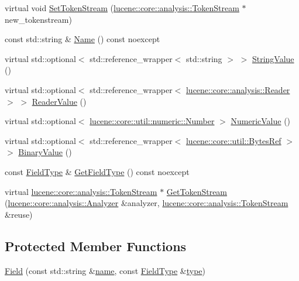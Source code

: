 \begin{DoxyCompactItemize}
\item 
virtual void \mbox{\hyperlink{classlucene_1_1core_1_1document_1_1Field_adfb4f4d5a2b2a8c9334186c93fd20c3b}{Set\+Token\+Stream}} (\mbox{\hyperlink{classlucene_1_1core_1_1analysis_1_1TokenStream}{lucene\+::core\+::analysis\+::\+Token\+Stream}} $\ast$new\+\_\+tokenstream)
\item 
const std\+::string \& \mbox{\hyperlink{classlucene_1_1core_1_1document_1_1Field_a9b6d39e8c30c59bfe0556c38beeeb06e}{Name}} () const noexcept
\item 
virtual std\+::optional$<$ std\+::reference\+\_\+wrapper$<$ std\+::string $>$ $>$ \mbox{\hyperlink{classlucene_1_1core_1_1document_1_1Field_a6b300229888f74a4cd76c40346c04234}{String\+Value}} ()
\item 
virtual std\+::optional$<$ std\+::reference\+\_\+wrapper$<$ \mbox{\hyperlink{classlucene_1_1core_1_1analysis_1_1Reader}{lucene\+::core\+::analysis\+::\+Reader}} $>$ $>$ \mbox{\hyperlink{classlucene_1_1core_1_1document_1_1Field_a06a7e8bad6d98767adee5e0e42941f06}{Reader\+Value}} ()
\item 
virtual std\+::optional$<$ \mbox{\hyperlink{classlucene_1_1core_1_1util_1_1numeric_1_1Number}{lucene\+::core\+::util\+::numeric\+::\+Number}} $>$ \mbox{\hyperlink{classlucene_1_1core_1_1document_1_1Field_a858814043215c98bacf6ecc823d078ea}{Numeric\+Value}} ()
\item 
virtual std\+::optional$<$ std\+::reference\+\_\+wrapper$<$ \mbox{\hyperlink{classlucene_1_1core_1_1util_1_1BytesRef}{lucene\+::core\+::util\+::\+Bytes\+Ref}} $>$ $>$ \mbox{\hyperlink{classlucene_1_1core_1_1document_1_1Field_adf4cc37537f8889dda2469c22481193b}{Binary\+Value}} ()
\item 
const \mbox{\hyperlink{classlucene_1_1core_1_1document_1_1FieldType}{Field\+Type}} \& \mbox{\hyperlink{classlucene_1_1core_1_1document_1_1Field_a06bffb93596bfbe170e795279d30ae4f}{Get\+Field\+Type}} () const noexcept
\item 
virtual \mbox{\hyperlink{classlucene_1_1core_1_1analysis_1_1TokenStream}{lucene\+::core\+::analysis\+::\+Token\+Stream}} $\ast$ \mbox{\hyperlink{classlucene_1_1core_1_1document_1_1Field_aa3d6b7ab7cb42820491c036872190317}{Get\+Token\+Stream}} (\mbox{\hyperlink{classlucene_1_1core_1_1analysis_1_1Analyzer}{lucene\+::core\+::analysis\+::\+Analyzer}} \&analyzer, \mbox{\hyperlink{classlucene_1_1core_1_1analysis_1_1TokenStream}{lucene\+::core\+::analysis\+::\+Token\+Stream}} \&reuse)
\end{DoxyCompactItemize}
\subsection*{Protected Member Functions}
\begin{DoxyCompactItemize}
\item 
\mbox{\hyperlink{classlucene_1_1core_1_1document_1_1Field_a84a767b968d36093ab2243ae64499e8b}{Field}} (const std\+::string \&\mbox{\hyperlink{classlucene_1_1core_1_1document_1_1Field_a52f673f3b3abb14b180f5159f4726537}{name}}, const \mbox{\hyperlink{classlucene_1_1core_1_1document_1_1FieldType}{Field\+Type}} \&\mbox{\hyperlink{classlucene_1_1core_1_1document_1_1Field_a7d5849d933ebde73422710069643ccff}{type}})
\end{DoxyCompactItemize}
